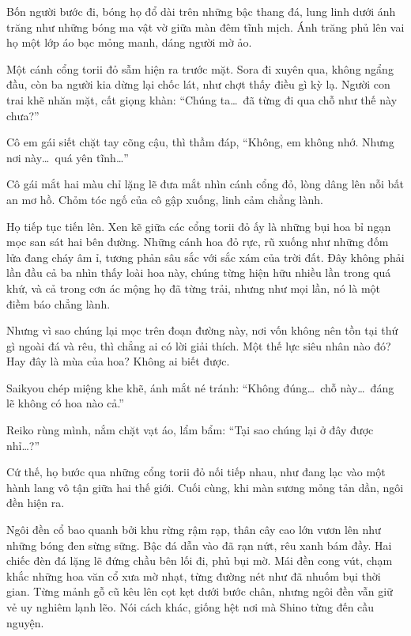 \documentclass[../main.tex]{subfiles}
\begin{document}
Bốn người bước đi, bóng họ đổ dài trên những bậc thang đá, lung linh dưới ánh trăng như những bóng ma vật vờ giữa màn đêm tĩnh mịch. Ánh trăng phủ lên vai họ một lớp áo bạc mỏng manh, dáng người mờ ảo.


Một cánh cổng torii đỏ sẫm hiện ra trước mặt. Sora đi xuyên qua, không ngẩng đầu, còn ba người kia dừng lại chốc lát, như chợt thấy điều gì kỳ lạ. Người con trai khẽ nhăn mặt, cất giọng khàn: ``Chúng ta\dots\ đã từng đi qua chỗ như thế này chưa?''

Cô em gái siết chặt tay cõng cậu, thì thầm đáp, ``Không, em không nhớ. Nhưng nơi này\dots\ quá yên tĩnh\dots''

Cô gái mắt hai màu chỉ lặng lẽ đưa mắt nhìn cánh cổng đỏ, lòng dâng lên nỗi bất an mơ hồ. Chỏm tóc ngố của cô gập xuống, linh cảm chẳng lành.

Họ tiếp tục tiến lên. Xen kẽ giữa các cổng torii đỏ ấy là những bụi hoa bỉ ngạn mọc san sát hai bên đường. Những cánh hoa đỏ rực, rũ xuống như những đốm lửa đang cháy âm ỉ, tương phản sâu sắc với sắc xám của trời đất. Đây không phải lần đầu cả ba nhìn thấy loài hoa này, chúng từng hiện hữu nhiều lần trong quá khứ, và cả trong cơn ác mộng họ đã từng trải, nhưng như mọi lần, nó là một điềm báo chẳng lành.


Nhưng vì sao chúng lại mọc trên đoạn đường này, nơi vốn không nên tồn tại thứ gì ngoài đá và rêu, thì chẳng ai có lời giải thích. Một thế lực siêu nhân nào đó? Hay đây là mùa của hoa? Không ai biết được.

Saikyou chép miệng khe khẽ, ánh mắt né tránh: ``Không đúng\dots\ chỗ này\dots\ đáng lẽ không có hoa nào cả.''

Reiko rùng mình, nắm chặt vạt áo, lẩm bẩm: ``Tại sao chúng lại ở đây được nhỉ\dots?''

Cứ thế, họ bước qua những cổng torii đỏ nối tiếp nhau, như đang lạc vào một hành lang vô tận giữa hai thế giới. Cuối cùng, khi màn sương mỏng tản dần, ngôi đền hiện ra.

Ngôi đền cổ bao quanh bởi khu rừng rậm rạp, thân cây cao lớn vươn lên như những bóng đen sừng sững. Bậc đá dẫn vào đã rạn nứt, rêu xanh bám đầy. Hai chiếc đèn đá lặng lẽ đứng chầu bên lối đi, phủ bụi mờ. Mái đền cong vút, chạm khắc những hoa văn cổ xưa mờ nhạt, từng đường nét như đã nhuốm bụi thời gian. Từng mảnh gỗ cũ kêu lên cọt kẹt dưới bước chân, nhưng ngôi đền vẫn giữ vẻ uy nghiêm lạnh lẽo. Nói cách khác, giống hệt nơi mà Shino từng đến cầu nguyện.
\end{document}
